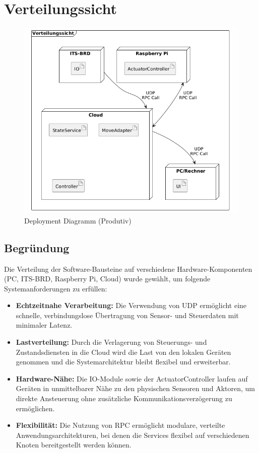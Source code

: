 \chapter{Verteilungssicht}

\begin{figure}[h!]
	\centering
	\includegraphics[scale=.5]{diagrams/deploymentView.png}
	\caption{Deployment Diagramm (Produtiv)}
	\label{fig:deployment-prod-grafik}
\end{figure}

\section{Begründung}

Die Verteilung der Software-Bausteine auf verschiedene Hardware-Komponenten (PC, ITS-BRD, Raspberry Pi, Cloud) wurde gewählt, um folgende Systemanforderungen zu erfüllen:

\begin{itemize}
    \item \textbf{Echtzeitnahe Verarbeitung:} Die Verwendung von UDP ermöglicht eine schnelle, verbindungslose Übertragung von Sensor- und Steuerdaten mit minimaler Latenz.
    \item \textbf{Lastverteilung:} Durch die Verlagerung von Steuerungs- und Zustandsdiensten in die Cloud wird die Last von den lokalen Geräten genommen und die Systemarchitektur bleibt flexibel und erweiterbar.
    \item \textbf{Hardware-Nähe:} Die IO-Module sowie der ActuatorController laufen auf Geräten in unmittelbarer Nähe zu den physischen Sensoren und Aktoren, um direkte Ansteuerung ohne zusätzliche Kommunikationsverzögerung zu ermöglichen.
    \item \textbf{Flexibilität:} Die Nutzung von RPC ermöglicht modulare, verteilte Anwendungsarchitekturen, bei denen die Services flexibel auf verschiedenen Knoten bereitgestellt werden können.
\end{itemize}

